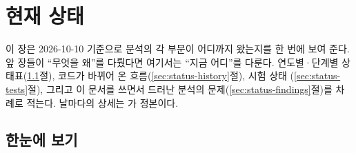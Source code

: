 \chapter{현재 상태}\label{ch:status}

이 장은 2026-10-10 기준으로 분석의 각 부분이 어디까지 왔는지를 한 번에 보여 준다. 앞 장들이 ``무엇을 왜''를 다뤘다면 여기서는
``지금 어디''를 다룬다. 연도별·단계별 상태표(\ref{sec:status-table}절), 코드가 바뀌어 온 흐름(\ref{sec:status-history}절), 시험 상태
(\ref{sec:status-tests}절), 그리고 이 문서를 쓰면서 드러난 분석의 문제(\ref{sec:status-findings}절)를 차례로 적는다. 날마다의 상세는
 가 정본이다.

\section{한눈에 보기}\label{sec:status-table}

